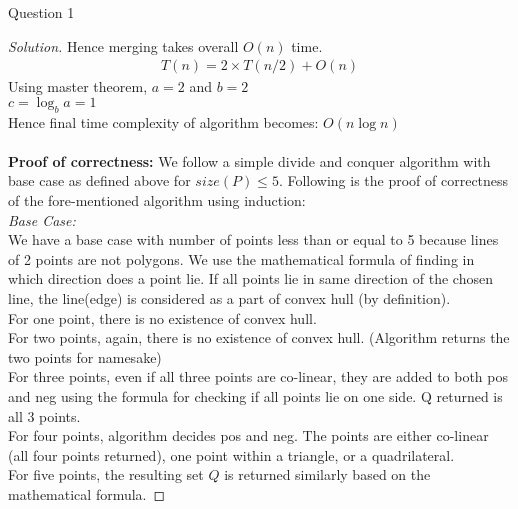 \begin{solution}{Question 1}
\begin{proof}[Solution]
        Hence merging takes overall $O(n)$ time.
        \begin{equation}
            \begin{split}
                T(n)= 2\times T(n/2)+O(n)
            \end{split}
        \end{equation}
        Using master theorem, $a=2$ and $b=2$\\
        $c=\log_b a = 1 $\\
        Hence final time complexity of algorithm becomes: $O(n \log n)$\\
        \\
        \textbf{Proof of correctness:}
        We follow a simple divide and conquer algorithm with base case as defined above for $size(P) \leq 5$. Following is the proof of correctness of the fore-mentioned algorithm using induction:\\
        \textit{Base Case:}\\
        We have a base case with number of points less than or equal to 5 because lines of 2 points are not polygons. We use the mathematical formula of finding in which direction does a point lie. If all points lie in same direction of the chosen line, the line(edge) is considered as a part of convex hull (by definition). \\
        For one point, there is no existence of convex hull.\\
        For two points, again, there is no existence of convex hull. (Algorithm returns the two points for namesake)\\
        For three points, even if all three points are co-linear, they are added to both pos and neg using the formula for checking if all points lie on one side. Q returned is all 3 points.\\
        For four points, algorithm decides pos and neg. The points are either co-linear (all four points returned), one point within a triangle, or a quadrilateral.\\
        For five points, the resulting set $Q$ is returned similarly based on the mathematical formula.
        

\end{proof}
\end{solution}
